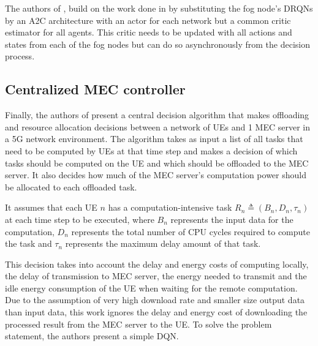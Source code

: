 The authors of \cite{Lulu}, build on the work done in \cite{fogmulti} by substituting the fog node's \acrshort{DRQN}s by an \acrshort{A2C} architecture with an actor for each network but a common critic estimator for all agents. This critic needs to be updated with all actions and states from each of the fog nodes but can do so asynchronously from the decision process.

\subsection{Centralized MEC controller}
\noindent Finally, the authors of \cite{NUE1mec} present a central decision algorithm that makes offloading and resource allocation decisions between a network of \acrshort{UE}s and 1 \acrshort{MEC} server in a 5G network environment. The algorithm takes as input a list of all tasks that need to be computed by \acrshort{UE}s at that time step and makes a decision of which tasks should be computed on the \acrshort{UE} and which should be offloaded to the \acrshort{MEC} server. It also decides how much of the \acrshort{MEC} server's computation power should be allocated to each offloaded task.

It assumes that each \acrshort{UE} $n$ has a computation-intensive task $R_n \triangleq (B_n, D_n, \tau_n)$ at each time step to be executed, where $B_n$ represents the input data for the computation, $D_n$ represents the total number of \acrshort{CPU} cycles required to compute the task and $\tau_n$ represents the maximum delay amount of that task.

This decision takes into account the delay and energy costs of computing locally, the delay of transmission to \acrshort{MEC} server, the energy needed to transmit and the idle energy consumption of the \acrshort{UE} when waiting for the remote computation. Due to the assumption of very high download rate and smaller size output data than input data, this work ignores the delay and energy cost of downloading the processed result from the \acrshort{MEC} server to the \acrshort{UE}. To solve the problem statement, the authors present a simple \acrshort{DQN}.